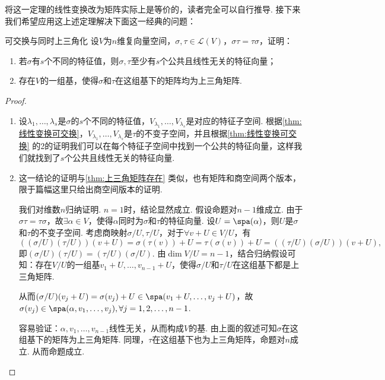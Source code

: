 将这一定理的线性变换改为矩阵实际上是等价的，读者完全可以自行推导. 接下来我们希望应用这上述定理解决下面这一经典的问题：
\begin{example}{}{可交换与同时上三角化}
    设$V$为$n$维复向量空间，$\sigma,\tau\in \mathcal{L}(V)$，$\sigma\tau=\tau\sigma$，证明：
    \begin{enumerate}
        \item 若$\sigma$有$s$个不同的特征值，则$\sigma,\tau$至少有$s$个公共且线性无关的特征向量；

        \item 存在$V$的一组基，使得$\sigma$和$\tau$在这组基下的矩阵均为上三角矩阵.
    \end{enumerate}
\end{example}

\begin{proof}
    \begin{enumerate}
        \item 设$\lambda_1,\ldots,\lambda_s$是$\sigma$的$s$个不同的特征值，$V_{\lambda_1},\ldots,V_{\lambda_s}$是对应的特征子空间. 根据\autoref{thm:线性变换可交换}，$V_{\lambda_1},\ldots,V_{\lambda_s}$是$\tau$的不变子空间，并且根据\autoref{thm:线性变换可交换} 的2的证明我们可以在每个特征子空间中找到一个公共的特征向量，这样我们就找到了$s$个公共且线性无关的特征向量.

        \item 这一结论的证明与\autoref{thm:上三角矩阵存在} 类似，也有矩阵和商空间两个版本，限于篇幅这里只给出商空间版本的证明.

        我们对维数$n$归纳证明. $n=1$时，结论显然成立. 假设命题对$n-1$维成立. 由于$\sigma\tau=\tau\sigma$，故$\exists \alpha\in V$，使得$\alpha$同时为$\sigma$和$\tau$的特征向量. 设$U=\spa(\alpha)$，则$U$是$\sigma$和$\tau$的不变子空间. 考虑商映射$\sigma/U,\tau/U$，对于$\forall v+U\in V/U$，有\[((\sigma/U)(\tau/U))(v+U)=\sigma(\tau(v))+U=\tau(\sigma(v))+U=((\tau/U)(\sigma/U))(v+U),\]
        即$(\sigma/U)(\tau/U)=(\tau/U)(\sigma/U)$. 由$\dim V/U=n-1$，结合归纳假设可知：存在$V/U$的一组基$v_1+U,\ldots,v_{n-1}+U$，使得$\sigma/U$和$\tau/U$在这组基下都是上三角矩阵.

        从而$(\sigma/U)(v_j+U)=\sigma(v_j)+U \in \spa(v_1+U,\ldots,v_j+U)$，故$\sigma(v_j)\in \spa(\alpha,v_1,\ldots,v_j),\forall j=1,2,\ldots,n-1$.

        容易验证：$\alpha,v_1,\ldots,v_{n-1}$线性无关，从而构成$V$的基. 由上面的叙述可知$\sigma$在这组基下的矩阵为上三角矩阵. 同理，$\tau$在这组基下也为上三角矩阵，命题对$n$成立. 从而命题成立.
    \end{enumerate}
\end{proof}

